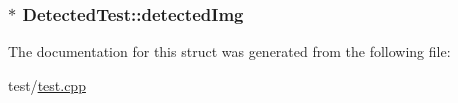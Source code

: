 \subsubsection[{\texorpdfstring{detected\+Img}{detectedImg}}]{$\ast$ Detected\+Test\+::detected\+Img}\hypertarget{structDetectedTest_a626f16728a762f1d3592cb063130a28a}{}\label{structDetectedTest_a626f16728a762f1d3592cb063130a28a}


The documentation for this struct was generated from the following file\+:\begin{DoxyCompactItemize}
\item 
test/\hyperlink{test_8cpp}{test.\+cpp}\end{DoxyCompactItemize}
